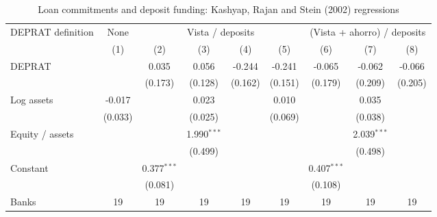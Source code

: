 
\begin{table}[!h]
   \centering
   \small
   \begin{threeparttable}[b]
      \caption{\label{tab:krs_comrat_deprat} Loan commitments and deposit funding: Kashyap, Rajan and Stein (2002) regressions}
      \bigskip
      \begin{tabular}{lcccccccc}
         \toprule
         DEPRAT definition & None & \multicolumn{4}{c}{Vista / deposits} & \multicolumn{3}{c}{(Vista + ahorro) / deposits} \\ 
         \cmidrule(lr){3-6} \cmidrule(lr){7-9}
                                          & (1)           & (2)           & (3)           & (4)           & (5)           & (6)           & (7)           & (8)\\  
         \midrule 
         DEPRAT                           &               & 0.035         & 0.056         & -0.244        & -0.241        & -0.065        & -0.062        & -0.066\\   
                                          &               & (0.173)       & (0.128)       & (0.162)       & (0.151)       & (0.179)       & (0.209)       & (0.205)\\   
         Log assets                       & -0.017        &               & 0.023         &               & 0.010         &               & 0.035         &   \\   
                                          & (0.033)       &               & (0.025)       &               & (0.069)       &               & (0.038)       &   \\   
         Equity / assets                  &               &               & 1.990$^{***}$ &               &               &               & 2.039$^{***}$ &   \\   
                                          &               &               & (0.499)       &               &               &               & (0.498)       &   \\   
         Constant                         &               & 0.377$^{***}$ &               &               &               & 0.407$^{***}$ &               &   \\   
                                          &               & (0.081)       &               &               &               & (0.108)       &               &   \\   
         Banks                            & 19            & 19            & 19            & 19            & 19            & 19            & 19            & 19\\  

\end{tabular}
\end{threeparttable}
\end{table}
